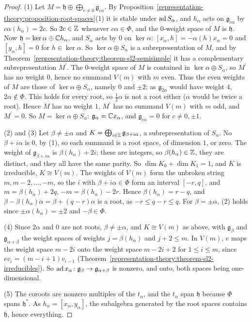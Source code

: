 \begin{proof}
(1) Let $M = \mathfrak{h} \oplus \bigoplus_{c \neq 0}\mathfrak{g}_{c\alpha}$. By Proposition~\ref{representation-theory:proposition-root-spaces}(1) it is stable under $\operatorname{ad} S_\alpha$, and
$h_\alpha$ acts on $\mathfrak{g}_{c\alpha}$ by $c\alpha(h_\alpha) = 2c$. So $2c \in \mathbb{Z}$ whenever $c\alpha \in \Phi$, and the $0$-weight space of $M$ is $\mathfrak{h}$. Now
$\mathfrak{h} = \ker\alpha \oplus \mathbb{C} h_\alpha$, and $S_\alpha$ acts by $0$ on $\ker\alpha$: $[x_\alpha, h] = -\alpha(h)x_\alpha = 0$ and $[y_\alpha, h] = 0$ for
$h \in \ker\alpha$. So $\ker\alpha \oplus S_\alpha$ is a subrepresentation of $M$, and by Theorem~\ref{representation-theory:theorem-sl2-semisimple} it has a complementary
subrepresentation $M^{\prime}$. The $0$-weight space of $M$ is contained in $\ker\alpha \oplus S_\alpha$, so $M^{\prime}$ has no weight $0$, hence no summand $V(m)$ with $m$ even. Thus
the even weights of $M$ are those of $\ker\alpha \oplus S_\alpha$, namely $0$ and $\pm2$; as $\mathfrak{g}_{2\alpha}$ would have weight $4$, $2\alpha \notin \Phi$. This holds for every
root, so $\frac12\alpha$ is not a root either ($\alpha$ would be twice a root). Hence $M$ has no weight $1$, $M^{\prime}$ has no summand $V(m)$ with $m$ odd, and $M^{\prime} = 0$. So
$M = \ker\alpha \oplus S_\alpha$: $\mathfrak{g}_\alpha = \mathbb{C} x_\alpha$, and $\mathfrak{g}_{c\alpha} = 0$ for $c \neq 0, \pm1$.

(2) and (3) Let $\beta \neq \pm\alpha$ and $K = \bigoplus_{i \in \mathbb{Z}}\mathfrak{g}_{\beta + i\alpha}$, a subrepresentation of $S_\alpha$. No $\beta + i\alpha$ is $0$, by (1), so each
summand is a root space, of dimension $1$, or zero. The weight of $\mathfrak{g}_{\beta + i\alpha}$ is $\beta(h_\alpha) + 2i$; these are integers, so $\beta(h_\alpha) \in \mathbb{Z}$, they are
distinct, and they all have the same parity. So $\dim K_0 + \dim K_1 = 1$, and $K$ is irreducible, $K \cong V(m)$. The weights of $V(m)$ form the unbroken string $m, m - 2, \ldots, -m$,
so the $i$ with $\beta + i\alpha \in \Phi$ form an interval $[-r, q]$, and $m = \beta(h_\alpha) + 2q$, $-m = \beta(h_\alpha) - 2r$. Hence $\beta(h_\alpha) = r - q$, and
$\beta - \beta(h_\alpha)\alpha = \beta + (q - r)\alpha$ is a root, as $-r \leq q - r \leq q$. For $\beta = \pm\alpha$, (2) holds since $\pm\alpha(h_\alpha) = \pm2$ and $-\beta \in \Phi$.

(4) Since $2\alpha$ and $0$ are not roots, $\beta \neq \pm\alpha$, and $K \cong V(m)$ as above, with $\mathfrak{g}_\beta$ and $\mathfrak{g}_{\alpha + \beta}$ the weight spaces of
weights $j = \beta(h_\alpha)$ and $j + 2 \leq m$. In $V(m)$, $e$ maps the weight space $m - 2i$ onto the weight space $m - 2i + 2$ for $1 \leq i \leq m$, since
$ev_i = (m - i + 1)v_{i-1}$ (Theorem~\ref{representation-theory:theorem-sl2-irreducibles}). So $\operatorname{ad} x_\alpha \colon \mathfrak{g}_\beta \to \mathfrak{g}_{\alpha + \beta}$ is nonzero, and
onto, both spaces being one-dimensional.

(5) The coroots are nonzero multiples of the $t_\alpha$, and the $t_\alpha$ span $\mathfrak{h}$ because $\Phi$ spans $\mathfrak{h}^*$. As $h_\alpha = [x_\alpha, y_\alpha]$, the
subalgebra generated by the root spaces contains $\mathfrak{h}$, hence everything.
\end{proof}


